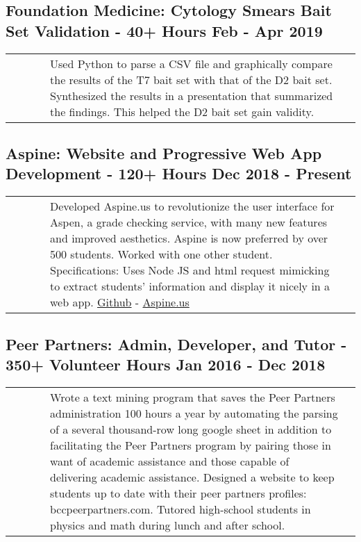 \documentclass{article}
\begin{document}
\subsection{Foundation Medicine: Cytology Smears Bait Set Validation - 40+ Hours \hfill Feb - Apr 2019\newline}

\begin{tabularx}{\linewidth}{ @{} l X r @{} }
\ \ \ \ \ & Used Python to parse a CSV file and graphically compare the results of the T7 bait set with that of the D2 bait set. Synthesized the results in a presentation that summarized the findings. This helped the D2 bait set gain validity.&
\end{tabularx}

\subsection{Aspine: Website and Progressive Web App Development - 120+ Hours \hfill Dec 2018 - Present\newline}

\begin{tabularx}{\linewidth}{ @{} l X r @{} }
\ \ \ \ \ & Developed Aspine.us to revolutionize the user interface for Aspen, a grade checking service, with many new features and improved aesthetics. Aspine is now preferred by over 500 students. Worked with one other student. Specifications: Uses Node JS and html request mimicking to extract students’ information and display it nicely in a web app. \href{https://github.com/maxtkc/aspine}{Github} - \href{https://aspine.us}{Aspine.us}
\end{tabularx}

\subsection{Peer Partners: Admin, Developer, and Tutor - 350+ Volunteer Hours \hfill Jan 2016 - Dec 2018\newline}

\begin{tabularx}{\linewidth}{ @{} l X r @{} }
\ \ \ \ \ & Wrote a text mining program that saves the Peer Partners administration 100 hours a year by automating the parsing of a several thousand-row long google sheet in addition to facilitating the Peer Partners program by pairing those in want of academic assistance and those capable of delivering academic assistance. Designed a website to keep students up to date with their peer partners profiles: bccpeerpartners.com. Tutored high-school students in physics and math during lunch and after school.
\end{tabularx}
\end{document}
